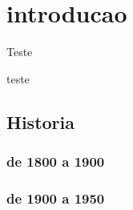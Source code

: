 \chapter{introducao} %
\label{cha:introducao}
Teste\cite{Fujiwara2000}

teste
\section{Historia} %
\label{sec:historia}
\subsection{de 1800 a 1900} %
\label{sub:de_1800_a_1900}

\subsection{de 1900 a 1950} %
\label{sub:de_1800_a_1900}



